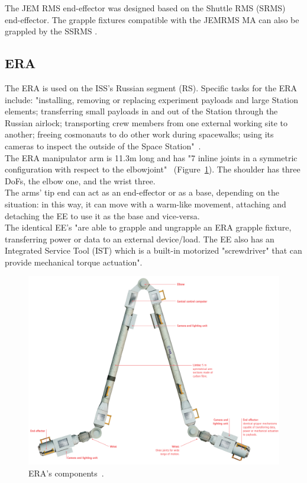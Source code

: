 \documentclass[a4paper,12pt,oneside]{report}
\begin{document}
The JEM RMS end-effector was designed based on the Shuttle RMS (SRMS) end-effector. The grapple fixtures compatible with the JEMRMS MA can also be grappled by the SSRMS \cite{four}.
\newpage
\subsection{ERA}
The ERA is used on the ISS's Russian segment (RS). Specific tasks for the ERA include: "installing, removing or replacing experiment payloads and large Station elements; transferring small payloads in and out of the Station through the Russian airlock; transporting crew members from one external working site to another; freeing cosmonauts to do other work during spacewalks; using its cameras to inspect the outside of the Space Station"~\cite{four}.\\
The ERA manipulator arm is 11.3m long and has "7 inline joints in a symmetric configuration with respect to the elbowjoint"~\cite{four} (Figure~\ref{ERA}). The shoulder has three DoFs, the elbow one, and the wrist three.\\
The arms' tip end can act as an end-effector or as a base, depending on the situation: in this way, it can move with a warm-like movement, attaching and detaching the EE to use it as the base and vice-versa.\\
The identical EE’s "are able to grapple and ungrapple an ERA grapple fixture, transferring power or data to an external device/load. The EE also has an Integrated Service Tool (IST) which is a built-in motorized "screwdriver" that can provide mechanical torque actuation"\cite{four}.\\
\begin{figure}[h]
  \centering
  \includegraphics[scale=0.4]{ERA.png}
  \caption{ERA's components~\cite{esa}.} 
  \label{ERA}
\end{figure}
\end{document}
